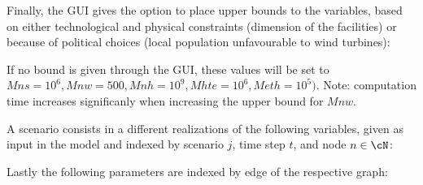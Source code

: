 Finally, the GUI gives the option to place upper bounds to the variables, based on either technological and physical constraints (dimension of the facilities) or because of political choices (local population unfavourable to wind turbines): 

If no bound is given through the GUI, these values will be set to $Mns=10^6, Mnw=500, Mnh=10^9, Mhte=10^6, Meth=10^5)$. Note: computation time increases significanly when increasing the upper bound for $Mnw$.

A scenario consists in a different realizations of the following variables, given as input in the model and  indexed by scenario \(j\), time step \(t\), and node \(n \in \cN\):

Lastly the following parameters are indexed by edge of the respective graph:

\color{black}

